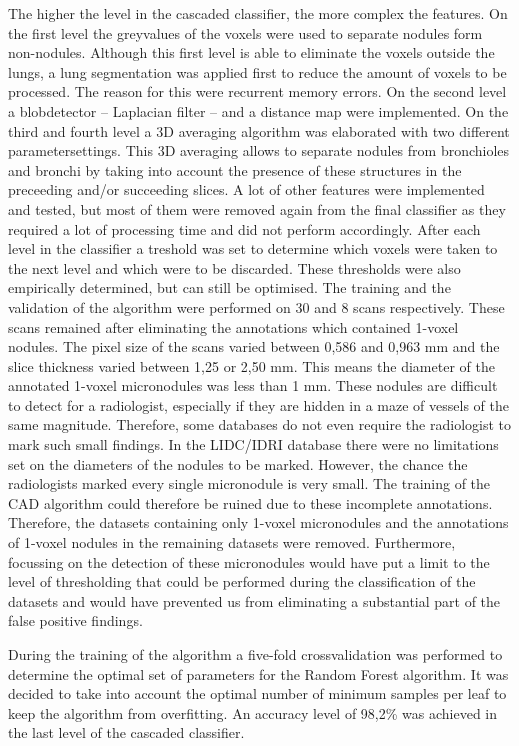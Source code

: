 The higher the level in the cascaded classifier, the more complex the features.
On the first level the greyvalues of the voxels were used to separate nodules
form non-nodules. Although this first level is able to eliminate the voxels
outside the lungs, a lung segmentation was applied first to reduce the amount of
voxels to be processed. The reason for this were recurrent memory errors. On the
second level a blobdetector -- Laplacian filter -- and a distance map were
implemented. On the third and fourth level a 3D averaging algorithm was
elaborated with two different parametersettings. This 3D averaging allows to
separate nodules from bronchioles and bronchi by taking into account the
presence of these structures in the preceeding and/or succeeding slices. A lot
of other features were implemented and tested, but most of them were removed
again from the final classifier as they required a lot of processing time and
did not perform accordingly. After each level in the classifier a treshold was
set to determine which voxels were taken to the next level and which were to be
discarded. These thresholds were also empirically determined, but can still be
optimised. The training and the validation of the algorithm were performed on 30
and 8 scans respectively. These scans remained after eliminating the annotations
which contained 1-voxel nodules. The pixel size of the scans varied between
0,586 and 0,963 mm and the slice thickness varied between 1,25 or 2,50 mm. This
means the diameter of the annotated 1-voxel micronodules was less than 1 mm.
These nodules are difficult to detect for a radiologist, especially if they are
hidden in a maze of vessels of the same magnitude. Therefore, some databases do
not even require the radiologist to mark such small findings. In the LIDC/IDRI
database there were no limitations set on the diameters of the nodules to be
marked. However, the chance the radiologists marked every single micronodule is
very small. The training of the CAD algorithm could therefore be ruined due to
these incomplete annotations. Therefore, the datasets containing only 1-voxel
micronodules and the annotations of 1-voxel nodules in the remaining datasets
were removed. Furthermore, focussing on the detection of these micronodules
would have put a limit to the level of thresholding that could be performed
during the classification of the datasets and would have prevented us from
eliminating a substantial part of the false positive findings.

During the training of the algorithm a five-fold crossvalidation was performed
to determine the optimal set of parameters for the Random Forest algorithm. It
was decided to take into account the optimal number of minimum samples per leaf
to keep the algorithm from overfitting. An accuracy level of 98,2\% was achieved
in the last level of the cascaded classifier.

